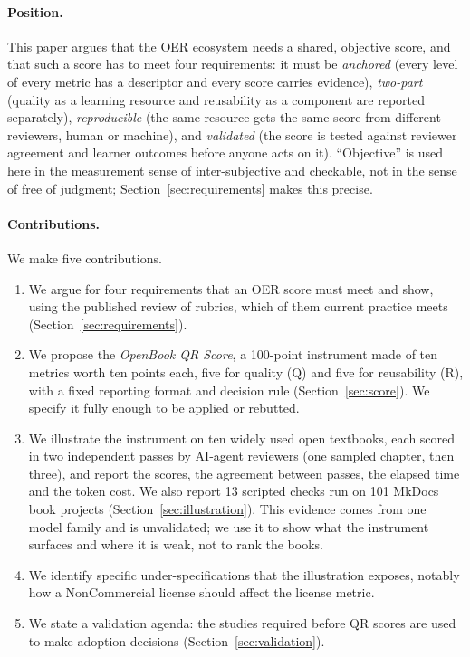 \paragraph{Position.}
This paper argues that the OER ecosystem needs a shared, objective score, and that such a score has to meet four requirements: it must be \emph{anchored} (every level of every metric has a descriptor and every score carries evidence), \emph{two-part} (quality as a learning resource and reusability as a component are reported separately), \emph{reproducible} (the same resource gets the same score from different reviewers, human or machine), and \emph{validated} (the score is tested against reviewer agreement and learner outcomes before anyone acts on it). ``Objective'' is used here in the measurement sense of inter-subjective and checkable, not in the sense of free of judgment; Section~\ref{sec:requirements} makes this precise.

\paragraph{Contributions.}
We make five contributions.
\begin{enumerate}[leftmargin=*,itemsep=2pt]
  \item We argue for four requirements that an OER score must meet and show, using the published review of rubrics, which of them current practice meets (Section~\ref{sec:requirements}).
  \item We propose the \emph{OpenBook QR Score}, a 100-point instrument made of ten metrics worth ten points each, five for quality (Q) and five for reusability (R), with a fixed reporting format and decision rule (Section~\ref{sec:score}). We specify it fully enough to be applied or rebutted.
  \item We illustrate the instrument on ten widely used open textbooks, each scored in two independent passes by AI-agent reviewers (one sampled chapter, then three), and report the scores, the agreement between passes, the elapsed time and the token cost. We also report 13 scripted checks run on 101 MkDocs book projects (Section~\ref{sec:illustration}). This evidence comes from one model family and is unvalidated; we use it to show what the instrument surfaces and where it is weak, not to rank the books.
  \item We identify specific under-specifications that the illustration exposes, notably how a NonCommercial license should affect the license metric.
  \item We state a validation agenda: the studies required before QR scores are used to make adoption decisions (Section~\ref{sec:validation}).
\end{enumerate}

